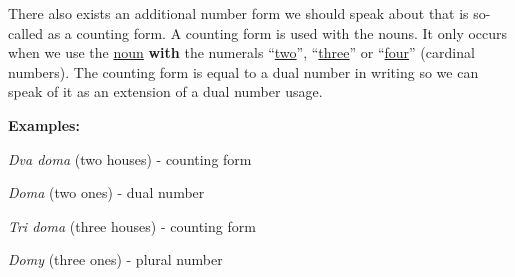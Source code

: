 There also exists an additional number form we should speak about that is so-called as a counting form. A counting form is used with the nouns. It only occurs when we use the \underline{noun} \textbf{with} the numerals “\underline{two}”, “\underline{three}” or “\underline{four}” (cardinal numbers). The counting form is equal to a dual number in writing so we can speak of it as an extension of a dual number usage.

\textbf{Examples:}

\textit{Dva doma} (two houses) - counting form

\textit{Doma} (two ones) - dual number

\textit{Tri doma} (three houses) - counting form

\textit{Domy} (three ones) - plural number 
